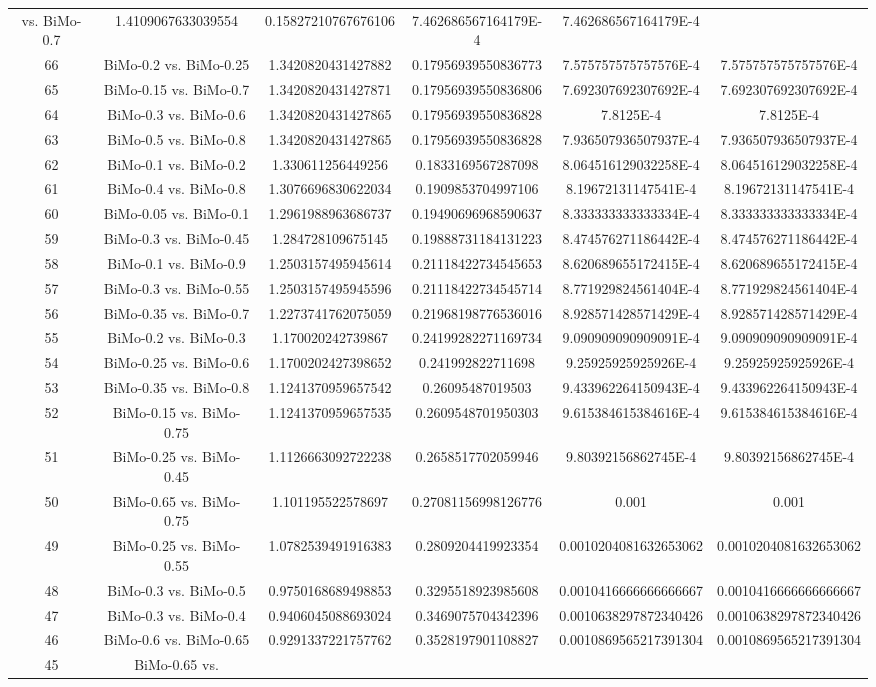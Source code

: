 \documentclass[a4paper,10pt]{article}
\begin{document}
\begin{landscape}
\begin{table}[!htp]
\begin{tabular}{cccccc}
vs. BiMo-0.7&1.4109067633039554&0.15827210767676106&7.462686567164179E-4&7.462686567164179E-4\\66&BiMo-0.2 vs. BiMo-0.25&1.3420820431427882&0.17956939550836773&7.575757575757576E-4&7.575757575757576E-4\\65&BiMo-0.15 vs. BiMo-0.7&1.3420820431427871&0.17956939550836806&7.692307692307692E-4&7.692307692307692E-4\\64&BiMo-0.3 vs. BiMo-0.6&1.3420820431427865&0.17956939550836828&7.8125E-4&7.8125E-4\\63&BiMo-0.5 vs. BiMo-0.8&1.3420820431427865&0.17956939550836828&7.936507936507937E-4&7.936507936507937E-4\\62&BiMo-0.1 vs. BiMo-0.2&1.330611256449256&0.1833169567287098&8.064516129032258E-4&8.064516129032258E-4\\61&BiMo-0.4 vs. BiMo-0.8&1.3076696830622034&0.1909853704997106&8.19672131147541E-4&8.19672131147541E-4\\60&BiMo-0.05 vs. BiMo-0.1&1.2961988963686737&0.19490696968590637&8.333333333333334E-4&8.333333333333334E-4\\59&BiMo-0.3 vs. BiMo-0.45&1.284728109675145&0.19888731184131223&8.474576271186442E-4&8.474576271186442E-4\\58&BiMo-0.1 vs. BiMo-0.9&1.2503157495945614&0.21118422734545653&8.620689655172415E-4&8.620689655172415E-4\\57&BiMo-0.3 vs. BiMo-0.55&1.2503157495945596&0.21118422734545714&8.771929824561404E-4&8.771929824561404E-4\\56&BiMo-0.35 vs. BiMo-0.7&1.2273741762075059&0.21968198776536016&8.928571428571429E-4&8.928571428571429E-4\\55&BiMo-0.2 vs. BiMo-0.3&1.170020242739867&0.24199282271169734&9.090909090909091E-4&9.090909090909091E-4\\54&BiMo-0.25 vs. BiMo-0.6&1.1700202427398652&0.241992822711698&9.25925925925926E-4&9.25925925925926E-4\\53&BiMo-0.35 vs. BiMo-0.8&1.1241370959657542&0.26095487019503&9.433962264150943E-4&9.433962264150943E-4\\52&BiMo-0.15 vs. BiMo-0.75&1.1241370959657535&0.2609548701950303&9.615384615384616E-4&9.615384615384616E-4\\51&BiMo-0.25 vs. BiMo-0.45&1.1126663092722238&0.2658517702059946&9.80392156862745E-4&9.80392156862745E-4\\50&BiMo-0.65 vs. BiMo-0.75&1.101195522578697&0.27081156998126776&0.001&0.001\\49&BiMo-0.25 vs. BiMo-0.55&1.0782539491916383&0.2809204419923354&0.0010204081632653062&0.0010204081632653062\\48&BiMo-0.3 vs. BiMo-0.5&0.9750168689498853&0.3295518923985608&0.0010416666666666667&0.0010416666666666667\\47&BiMo-0.3 vs. BiMo-0.4&0.9406045088693024&0.3469075704342396&0.0010638297872340426&0.0010638297872340426\\46&BiMo-0.6 vs. BiMo-0.65&0.9291337221757762&0.3528197901108827&0.0010869565217391304&0.0010869565217391304\\45&BiMo-0.65 vs. 
\end{tabular}
\end{table}
\end{landscape}
\end{document}
